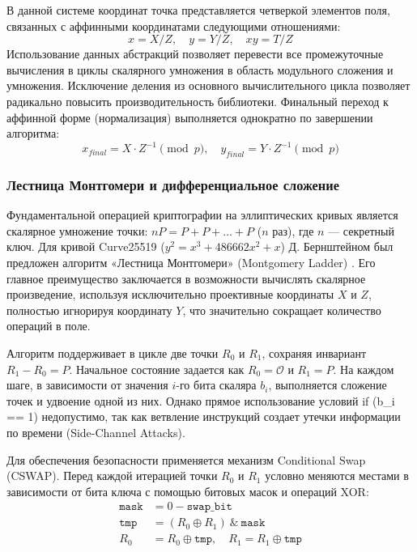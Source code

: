 В данной системе координат точка представляется четверкой элементов поля, связанных с аффинными координатами следующими отношениями:
\begin{equation}
    x = X/Z, \quad y = Y/Z, \quad xy = T/Z
\end{equation}
Использование данных абстракций позволяет перевести все промежуточные вычисления в циклы скалярного умножения в область модульного сложения и умножения. Исключение деления из основного вычислительного цикла позволяет радикально повысить производительность библиотеки. Финальный переход к аффинной форме (нормализация) выполняется однократно по завершении алгоритма:
\begin{equation}
    x_{final} = X \cdot Z^{-1} \pmod p, \quad y_{final} = Y \cdot Z^{-1} \pmod p
\end{equation}
\subsubsection{Лестница Монтгомери и дифференциальное сложение}

Фундаментальной операцией криптографии на эллиптических кривых является скалярное умножение точки: $nP = P + P + \dots + P$ ($n$ раз), где $n$ — секретный ключ. Для кривой Curve25519 ($y^2 = x^3 + 486662x^2 + x$) Д. Бернштейном был предложен алгоритм «Лестница Монтгомери» (Montgomery Ladder) \cite{RFC7748}. Его главное преимущество заключается в возможности вычислять скалярное произведение, используя исключительно проективные координаты $X$ и $Z$, полностью игнорируя координату $Y$, что значительно сокращает количество операций в поле.

Алгоритм поддерживает в цикле две точки $R_0$ и $R_1$, сохраняя инвариант $R_1 - R_0 = P$. Начальное состояние задается как $R_0 = \mathcal{O}$ и $R_1 = P$. На каждом шаге, в зависимости от значения $i$-го бита скаляра $b_i$, выполняется сложение точек и удвоение одной из них. Однако прямое использование условий if (b\_i == 1) недопустимо, так как ветвление инструкций создает утечки информации по времени (Side-Channel Attacks).

Для обеспечения безопасности применяется механизм Conditional Swap (CSWAP). Перед каждой итерацией точки $R_0$ и $R_1$ условно меняются местами в зависимости от бита ключа с помощью битовых масок и операций XOR:
\begin{equation}
\begin{aligned}
    \texttt{mask} &= 0 - \texttt{swap\_bit} \\
    \texttt{tmp} &= (R_0 \oplus R_1) \ \& \ \texttt{mask} \\
    R_0 &= R_0 \oplus \texttt{tmp}, \quad R_1 = R_1 \oplus \texttt{tmp}
\end{aligned}
\end{equation}

